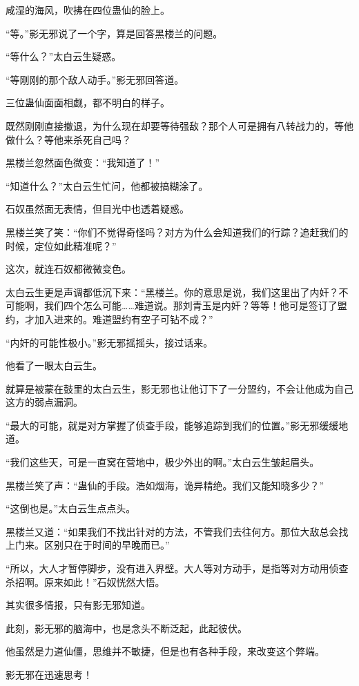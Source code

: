 \begin{this_body}
咸湿的海风，吹拂在四位蛊仙的脸上。

“等。”影无邪说了一个字，算是回答黑楼兰的问题。

“等什么？”太白云生疑惑。

“等刚刚的那个敌人动手。”影无邪回答道。

三位蛊仙面面相觑，都不明白的样子。

既然刚刚直接撤退，为什么现在却要等待强敌？那个人可是拥有八转战力的，等他做什么？等他来杀死自己吗？

黑楼兰忽然面色微变：“我知道了！”

“知道什么？”太白云生忙问，他都被搞糊涂了。

石奴虽然面无表情，但目光中也透着疑惑。

黑楼兰笑了笑：“你们不觉得奇怪吗？对方为什么会知道我们的行踪？追赶我们的时候，定位如此精准呢？”

这次，就连石奴都微微变色。

太白云生更是声调都低沉下来：“黑楼兰。你的意思是说，我们这里出了内奸？不可能啊，我们四个怎么可能……难道说。那刘青玉是内奸？等等！他可是签订了盟约，才加入进来的。难道盟约有空子可钻不成？”

“内奸的可能性极小。”影无邪摇摇头，接过话来。

他看了一眼太白云生。

就算是被蒙在鼓里的太白云生，影无邪也让他订下了一分盟约，不会让他成为自己这方的弱点漏洞。

“最大的可能，就是对方掌握了侦查手段，能够追踪到我们的位置。”影无邪缓缓地道。

“我们这些天，可是一直窝在营地中，极少外出的啊。”太白云生皱起眉头。

黑楼兰笑了声：“蛊仙的手段。浩如烟海，诡异精绝。我们又能知晓多少？”

“这倒也是。”太白云生点点头。

黑楼兰又道：“如果我们不找出针对的方法，不管我们去往何方。那位大敌总会找上门来。区别只在于时间的早晚而已。”

“所以，大人才暂停脚步，没有进入界壁。大人等对方动手，是指等对方动用侦查杀招啊。原来如此！”石奴恍然大悟。

其实很多情报，只有影无邪知道。

此刻，影无邪的脑海中，也是念头不断泛起，此起彼伏。

他虽然是力道仙僵，思维并不敏捷，但是也有各种手段，来改变这个弊端。

影无邪在迅速思考！


\end{this_body}
